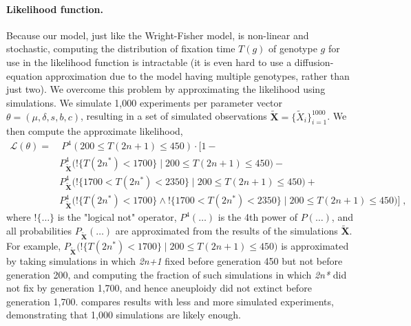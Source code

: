 \documentclass[12pt]{extarticle}
\let\vec\mathbf
\newcommand{\likelihood}{\mathcal{L}}
\newcommand{\anwt}{\emph{2n+1}}
\newcommand{\eumt}{\emph{2n*}}
\begin{document}
\paragraph{Likelihood function.} 
Because our model, just like the Wright-Fisher model, is non-linear and stochastic, computing the distribution of fixation time $T(g)$ of genotype $g$ for use in the likelihood function is intractable (it is even hard to use a diffusion-equation approximation due to the model having multiple genotypes, rather than just two).
We overcome this problem by approximating the likelihood using simulations. We simulate 1,000 experiments per parameter vector $\theta = (\mu, \delta, s, b, c)$, resulting in a set of simulated observations $\tilde{\vec X} = \{\tilde{X}_i\}_{i=1}^{1000}$. We then compute the approximate likelihood,
\begin{equation}\begin{aligned}
\label{eq:heatstress-likelihood}
\likelihood(\theta) = &\ P^4(200 \le T(2n+1) \le 450) \cdot 
	\Big[1 - \\
	&	P_{\tilde{\vec X}}^4\big(!\{T(2n^*)<1700\} \mid 200 \le T(2n+1) \le 450\big)- \\
	&	P_{\tilde{\vec X}}^4\big(!\{1700 < T(2n^*) < 2350\} \mid 200 \le T(2n+1) \le 450\big)+ \\
	&	P_{\tilde{\vec X}}^4\big(!\{T(2n^*)<1700\} \land !\{1700 < T(2n^*) < 2350\} \mid 200 \le T(2n+1) \le 450\big) 
	\Big]\;,
\end{aligned}\end{equation}
where $!\{\ldots\}$ is the "logical not" operator, $P^4(\ldots)$ is the 4th power of $P(\ldots)$, and all probabilities $P_{\tilde{\vec X}}(\ldots)$ are approximated from the results of the simulations $\tilde{\vec X}$. For example, $P_{\tilde{\vec X}}\big(!\{T(2n^*)<1700\} \mid 200 \le T(2n+1) \le 450\big)$ is approximated by taking simulations in which \anwt\; fixed before generation 450 but not before generation 200, and computing the fraction of such simulations in which \eumt\; did not fix by generation 1,700, and hence aneuploidy did not extinct before generation 1,700.
 compares results with less and more simulated experiments, demonstrating that 1,000 simulations are likely enough.
 
\end{document}
